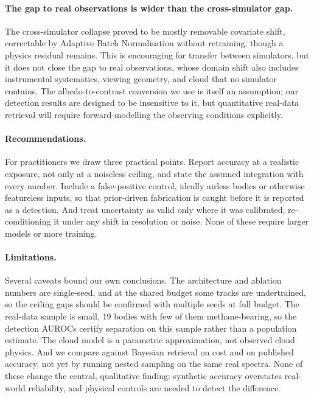 \documentclass[11pt,twocolumn]{article}
\begin{document}
\paragraph{The gap to real observations is wider than the cross-simulator gap.}
The cross-simulator collapse proved to be mostly removable covariate shift,
correctable by Adaptive Batch Normalisation without retraining, though a physics
residual remains. This is encouraging for transfer between simulators, but it does
not close the gap to real observations, whose domain shift also includes
instrumental systematics, viewing geometry, and cloud that no simulator contains.
The albedo-to-contrast conversion we use is itself an assumption; our detection
results are designed to be insensitive to it, but quantitative real-data retrieval
will require forward-modelling the observing conditions explicitly.

\paragraph{Recommendations.} For practitioners we draw three practical points.
Report accuracy at a realistic exposure, not only at a noiseless ceiling, and
state the assumed integration with every number. Include a false-positive control,
ideally airless bodies or otherwise featureless inputs, so that prior-driven
fabrication is caught before it is reported as a detection. And treat uncertainty
as valid only where it was calibrated, re-conditioning it under any shift in
resolution or noise. None of these require larger models or more training.

\paragraph{Limitations.} Several caveats bound our own conclusions. The
architecture and ablation numbers are single-seed, and at the shared budget some
tracks are undertrained, so the ceiling gaps should be confirmed with multiple
seeds at full budget. The real-data sample is small, 19 bodies with few of them
methane-bearing, so the detection AUROCs certify separation on this sample rather
than a population estimate. The cloud model is a parametric approximation, not
observed cloud physics. And we compare against Bayesian retrieval on cost and on
published accuracy, not yet by running nested sampling on the same real spectra.
None of these change the central, qualitative finding: synthetic accuracy
overstates real-world reliability, and physical controls are needed to detect the
difference.
\end{document}
